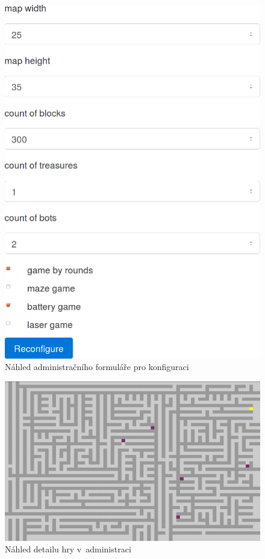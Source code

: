 \begin{figure}[h]
	\centering
	\includegraphics{assets/admin-conf-form}
	\caption{Náhled administračního formuláře pro konfiguraci}
	\label{fig:admin-conf-form}
\end{figure}

\begin{landscape}
\begin{figure}[h]
	\centering
	\includegraphics[width=\hsize]{assets/admin-game-detail}
	\caption{Náhled detailu hry v~administraci}
	\label{fig:admin-game-detail}
\end{figure}
\end{landscape}
